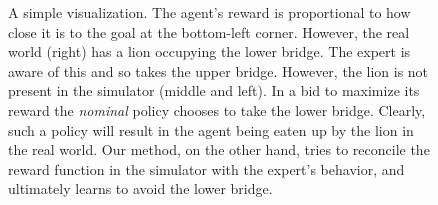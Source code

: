 \documentclass{article}
\begin{document}
\begin{figure}[t]
\vskip 0.2in
\begin{center}
    \caption{A simple visualization. The agent's reward is proportional to how close it is to the goal at the bottom-left corner. However, the real world (right) has a lion occupying the lower bridge. The expert is aware of this and so takes the upper bridge. However, the lion is not present in the simulator (middle and left). In a bid to maximize its reward the \textit{nominal} policy chooses to take the lower bridge. Clearly, such a policy will result in the agent being eaten up by the lion in the real world. Our method, on the other hand, tries to reconcile the reward function in the simulator with the expert's behavior, and ultimately learns to avoid the lower bridge.}
    \label{fig:twob}
\end{center}
\vskip -0.2in
\end{figure}
\end{document}
